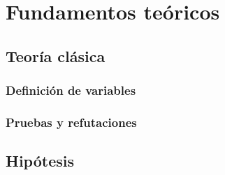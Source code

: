 \chapter{Fundamentos teóricos}
 \section{Teoría clásica}
    \subsection{Definición de variables}
    \subsection{Pruebas y refutaciones}
\section{Hipótesis}
